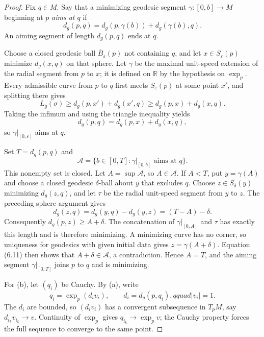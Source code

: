 \begin{proof}

\sketch Fix $q\in M$. Say that a minimizing geodesic segment
$\gamma\colon[0,b]\to M$ beginning at $p$ \emph{aims at $q$} if
\begin{equation}
d_g(p,q)=d_g(p,\gamma(b))+d_g(\gamma(b),q). \tag{6.9}
\end{equation}
An aiming segment of length $d_g(p,q)$ ends at $q$.

Choose a closed geodesic ball $\overline B_\varepsilon(p)$ not containing
$q$, and let $x\in S_\varepsilon(p)$ minimize $d_g(x,q)$ on that sphere. Let
$\gamma$ be the maximal unit-speed extension of the radial segment from $p$ to
$x$; it is defined on $\mathbb R$ by the hypothesis on $\exp_p$. Every
admissible curve from $p$ to $q$ first meets $S_\varepsilon(p)$ at some point
$x'$, and splitting there gives
\[
L_g(\sigma)\geq d_g(p,x')+d_g(x',q)
\geq d_g(p,x)+d_g(x,q).
\]
Taking the infimum and using the triangle inequality yields
\begin{equation}
d_g(p,q)=d_g(p,x)+d_g(x,q), \tag{6.10}
\end{equation}
so $\gamma|_{[0,\varepsilon]}$ aims at $q$.

Set $T=d_g(p,q)$ and
\[
\mathcal A=\{b\in[0,T]:\gamma|_{[0,b]}\text{ aims at }q\}.
\]
This nonempty set is closed. Let $A=\sup\mathcal A$, so $A\in\mathcal A$.
If $A<T$, put $y=\gamma(A)$ and choose a closed geodesic
$\delta$-ball about $y$ that excludes $q$. Choose
$z\in S_\delta(y)$ minimizing $d_g(z,q)$, and let $\tau$ be the radial
unit-speed segment from $y$ to $z$. The preceding sphere argument gives
\begin{equation}
d_g(z,q)=d_g(y,q)-d_g(y,z)=(T-A)-\delta. \tag{6.11}
\end{equation}
Consequently $d_g(p,z)\geq A+\delta$. The concatenation of
$\gamma|_{[0,A]}$ and $\tau$ has exactly this length and is therefore
minimizing. A minimizing curve has no corner, so uniqueness for geodesics with
given initial data gives $z=\gamma(A+\delta)$. Equation (6.11) then shows that
$A+\delta\in\mathcal A$, a contradiction. Hence $A=T$, and the aiming segment
$\gamma|_{[0,T]}$ joins $p$ to $q$ and is minimizing.

For (b), let $(q_i)$ be Cauchy. By (a), write
\[
q_i=\exp_p(d_iv_i),
\qquad d_i=d_g(p,q_i),qquad |v_i|=1.
\]
The $d_i$ are bounded, so $(d_iv_i)$ has a convergent subsequence in $T_pM$,
say $d_{i_k}v_{i_k}\to v$. Continuity of $\exp_p$ gives
$q_{i_k}\to\exp_pv$; the Cauchy property forces the full sequence to converge
to the same point.
\end{proof}

